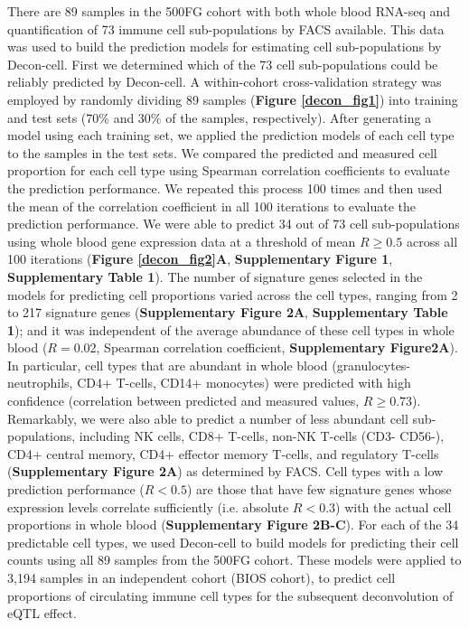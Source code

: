 There are 89 samples in the 500FG cohort with both whole blood RNA-seq and quantification of 73 immune cell sub-populations by FACS available. This data was used to build the prediction models for estimating cell sub-populations by Decon-cell. First we determined which of the 73 cell sub-populations could be reliably predicted by Decon-cell. A within-cohort cross-validation strategy was employed by randomly dividing 89 samples (\textbf{Figure \ref{decon_fig1}}) into training and test sets (70\% and 30\% of the samples, respectively). After generating a model using each training set, we applied the prediction models of each cell type to the samples in the test sets. We compared the predicted and measured cell proportion for each cell type using Spearman correlation coefficients to evaluate the  prediction performance. We repeated this process 100 times and then used the mean of the correlation coefficient in all 100 iterations to evaluate the prediction performance. We were able to predict 34 out of 73 cell sub-populations using whole blood gene expression data at a threshold of mean $R \geq 0.5$ across all 100 iterations (\textbf{Figure \ref{decon_fig2}A}, \textbf{Supplementary Figure 1}, \textbf{Supplementary Table 1}). The number of signature genes selected in the models for predicting cell proportions varied across the cell types, ranging from 2 to 217 signature genes (\textbf{Supplementary Figure 2A}, \textbf{Supplementary Table 1}); and it was independent of the average abundance of these cell types in whole blood ($R = 0.02$, Spearman correlation coefficient, \textbf{Supplementary Figure2A}). In particular, cell types that are abundant in whole blood (granulocytes-neutrophils, CD4+ T-cells, CD14+ monocytes) were predicted with high confidence (correlation between predicted and measured values, $R \geq 0.73$). Remarkably, we were also able to predict a number of less abundant cell sub-populations, including NK cells, CD8+ T-cells, non-NK T-cells (CD3- CD56-), CD4+ central memory, CD4+ effector memory T-cells, and regulatory T-cells (\textbf{Supplementary Figure 2A}) as determined by FACS. Cell types with a low prediction performance ($R < 0.5$) are those that have few signature genes whose expression levels correlate sufficiently (i.e. absolute $R < 0.3$) with the actual cell proportions in whole blood (\textbf{Supplementary Figure 2B-C}). For each of the 34 predictable cell types, we used Decon-cell to build models for predicting their cell counts using all 89 samples from the 500FG cohort. These models were applied to 3,194 samples in an independent cohort (BIOS cohort), to predict cell proportions of circulating immune cell types for the subsequent deconvolution of eQTL effect. 

